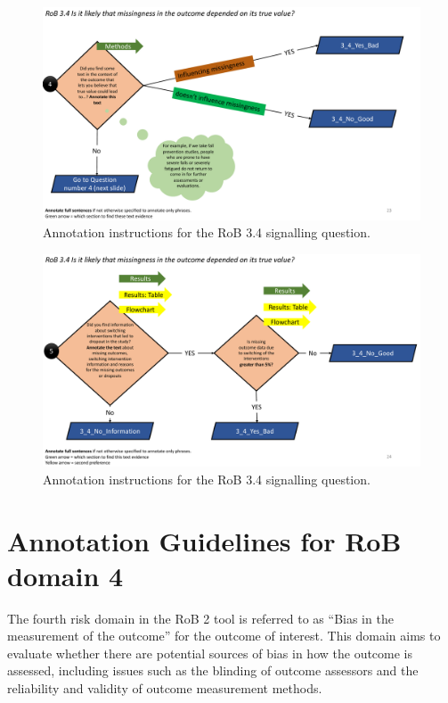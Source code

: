 \documentclass[sn-mathphys,Numbered]{sn-jnl}%
\begin{document}
\begin{figure}[hbt]
    \centering
    \includegraphics[width=\textwidth]{figures/3_4_4.pdf}
    \caption{Annotation instructions for the RoB 3.4 signalling question.}
    \label{fig:3_4_4}
\end{figure}


\begin{figure}[hbt]
    \centering
    \includegraphics[width=\textwidth]{figures/3_4_5.pdf}
    \caption{Annotation instructions for the RoB 3.4 signalling question.}
    \label{fig:3_4_5}
\end{figure}
%
%
%
\clearpage
%
%
%
\section*{Annotation Guidelines for RoB domain 4}
\label{sec:dom4}
%
The fourth risk domain in the RoB 2 tool is referred to as ``Bias in the measurement of the outcome'' for the outcome of interest.
This domain aims to evaluate whether there are potential sources of bias in how the outcome is assessed, including issues such as the blinding of outcome assessors and the reliability and validity of outcome measurement methods.
%
%
%
\end{document}
